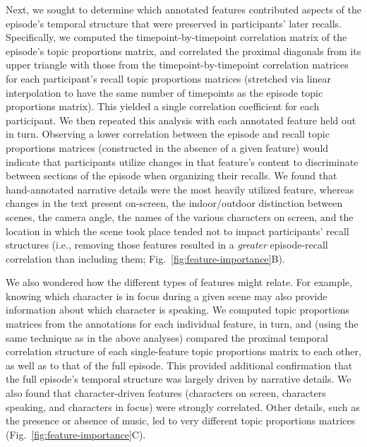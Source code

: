 \documentclass{article}
\begin{document}
Next, we sought to determine which annotated features contributed aspects of the episode's temporal structure that were preserved in participants' later recalls.  Specifically, we computed the timepoint-by-timepoint correlation matrix of the episode's topic proportions matrix, and correlated the proximal diagonals from its upper triangle with those from the timepoint-by-timepoint correlation matrices for each participant's recall topic proportions matrices (stretched via linear interpolation to have the same number of timepoints as the episode topic proportions matrix).  This yielded a single correlation coefficient for each participant.  We then repeated this analysis with each annotated feature held out in turn.  Observing a lower correlation between the episode and recall topic proportions matrices (constructed in the absence of a given feature) would indicate that participants utilize changes in that feature's content to discriminate between sections of the episode when organizing their recalls.  We found that hand-annotated narrative details were the most heavily utilized feature, whereas changes in the text present on-screen, the indoor/outdoor distinction between scenes, the camera angle, the names of the various characters on screen, and the location in which the scene took place tended not to impact participants' recall structures (i.e., removing those features resulted in a \textit{greater} episode-recall correlation than including them; Fig.~\ref{fig:feature-importance}B).

We also wondered how the different types of features might relate.  For example, knowing which character is in focus during a given scene may also provide information about which character is speaking.  We computed topic proportions matrices from the annotations for each individual feature, in turn, and (using the same technique as in the above analyses) compared the proximal temporal correlation structure of each single-feature topic proportions matrix to each other, as well as to that of the full episode.  This provided additional confirmation that the full episode's temporal structure was largely driven by narrative details.  We also found that character-driven features (characters on screen, characters speaking, and characters in focus) were strongly correlated.  Other details, such as the presence or absence of music, led to very different topic proportions matrices (Fig.~\ref{fig:feature-importance}C).
\end{document}
